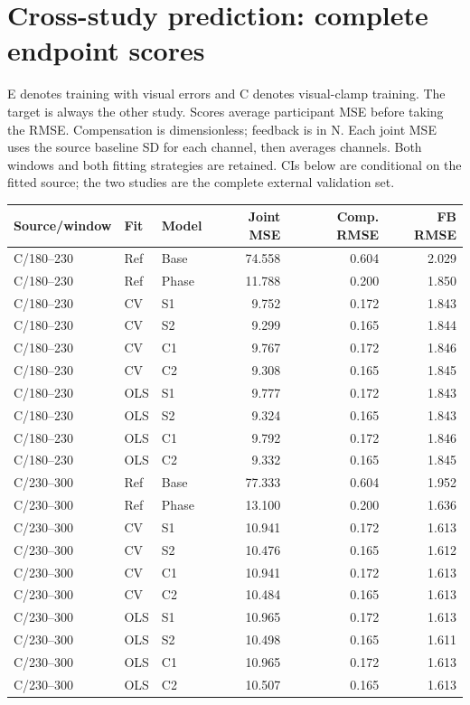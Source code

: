 \documentclass[11pt,a4paper]{article}
\begin{document}
\clearpage\section{Cross-study prediction: complete endpoint scores}
E denotes training with visual errors and C denotes visual-clamp training. The target is always the other study. Scores average participant MSE before taking the RMSE. Compensation is dimensionless; feedback is in N. Each joint MSE uses the source baseline SD for each channel, then averages channels. Both windows and both fitting strategies are retained. CIs below are conditional on the fitted source; the two studies are the complete external validation set.
\small\begin{longtable}{lllr rr}\toprule
Source/window & Fit & Model & Joint MSE & Comp. RMSE & FB RMSE\\\midrule\endhead
C/180--230 & Ref & Base & 74.558 & 0.604 & 2.029\\
C/180--230 & Ref & Phase & 11.788 & 0.200 & 1.850\\
C/180--230 & CV & S1 & 9.752 & 0.172 & 1.843\\
C/180--230 & CV & S2 & 9.299 & 0.165 & 1.844\\
C/180--230 & CV & C1 & 9.767 & 0.172 & 1.846\\
C/180--230 & CV & C2 & 9.308 & 0.165 & 1.845\\
C/180--230 & OLS & S1 & 9.777 & 0.172 & 1.843\\
C/180--230 & OLS & S2 & 9.324 & 0.165 & 1.843\\
C/180--230 & OLS & C1 & 9.792 & 0.172 & 1.846\\
C/180--230 & OLS & C2 & 9.332 & 0.165 & 1.845\\
C/230--300 & Ref & Base & 77.333 & 0.604 & 1.952\\
C/230--300 & Ref & Phase & 13.100 & 0.200 & 1.636\\
C/230--300 & CV & S1 & 10.941 & 0.172 & 1.613\\
C/230--300 & CV & S2 & 10.476 & 0.165 & 1.612\\
C/230--300 & CV & C1 & 10.941 & 0.172 & 1.613\\
C/230--300 & CV & C2 & 10.484 & 0.165 & 1.613\\
C/230--300 & OLS & S1 & 10.965 & 0.172 & 1.613\\
C/230--300 & OLS & S2 & 10.498 & 0.165 & 1.611\\
C/230--300 & OLS & C1 & 10.965 & 0.172 & 1.613\\
C/230--300 & OLS & C2 & 10.507 & 0.165 & 1.613\\

\end{longtable}
\end{document}

